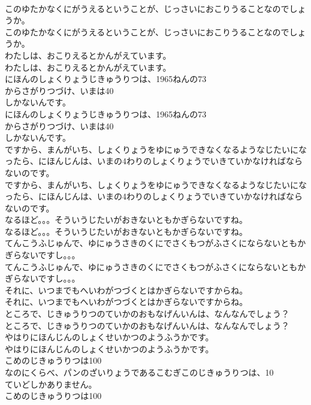 \documentclass[8pt]{extreport}
\begin{document}
\begin{CJK}{UTF8}{min}
\\	このゆたかなくにがうえるということが、じっさいにおこりうることなのでしょうか。
\\	このゆたかなくにがうえるということが、じっさいにおこりうることなのでしょうか。
\\	わたしは、おこりえるとかんがえています。
\\	わたしは、おこりえるとかんがえています。
\\	にほんのしょくりょうじきゅうりつは、1965ねんの73
\\	からさがりつづけ、いまは40
\\	しかないんです。
\\	にほんのしょくりょうじきゅうりつは、1965ねんの73
\\	からさがりつづけ、いまは40
\\	しかないんです。
\\	ですから、まんがいち、しょくりょうをゆにゅうできなくなるようなじたいになったら、にほんじんは、いまの4わりのしょくりょうでいきていかなければならないのです。
\\	ですから、まんがいち、しょくりょうをゆにゅうできなくなるようなじたいになったら、にほんじんは、いまの4わりのしょくりょうでいきていかなければならないのです。
\\	なるほど。。。そういうじたいがおきないともかぎらないですね。
\\	なるほど。。。そういうじたいがおきないともかぎらないですね。
\\	てんこうふじゅんで、ゆにゅうさきのくにでさくもつがふさくにならないともかぎらないですし。。。
\\	てんこうふじゅんで、ゆにゅうさきのくにでさくもつがふさくにならないともかぎらないですし。。。
\\	それに、いつまでもへいわがつづくとはかぎらないですからね。
\\	それに、いつまでもへいわがつづくとはかぎらないですからね。
\\	ところで、じきゅうりつのていかのおもなげんいんは、なんなんでしょう？
\\	ところで、じきゅうりつのていかのおもなげんいんは、なんなんでしょう？
\\	やはりにほんじんのしょくせいかつのようふうかです。
\\	やはりにほんじんのしょくせいかつのようふうかです。
\\	こめのじきゅうりつは100
\\	なのにくらべ、パンのざいりょうであるこむぎこのじきゅうりつは、10
\\	ていどしかありません。
\\	こめのじきゅうりつは100

\end{CJK}
\end{document}
